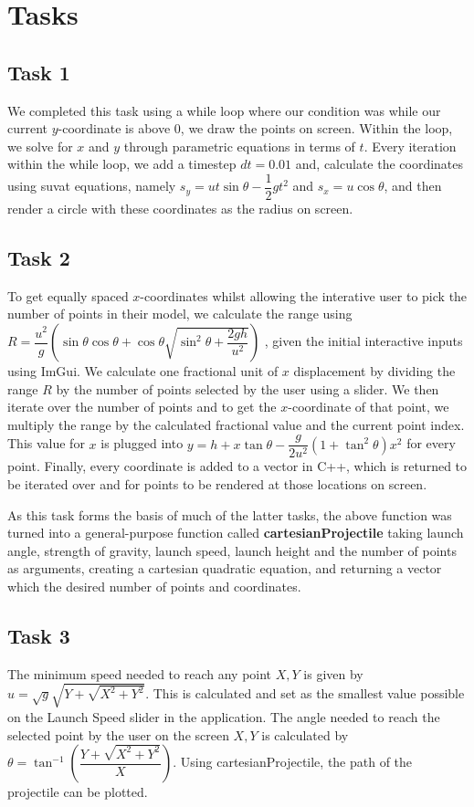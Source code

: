 \documentclass[main.tex]{subfiles}
\begin{document}
 
\section{Tasks}
\subsection{Task 1}
We completed this task using a while loop where our condition was while our current $y$-coordinate is above 0, we draw the points on screen. Within the loop, we solve for $x$ and $y$ through parametric equations in terms of $t$. Every iteration within the while loop, we add a timestep $dt = 0.01$ and, calculate the coordinates using suvat equations, namely $s_y = u t \sin\theta  - \dfrac{1}{2} g t^2$ and $s_x = u \cos\theta$, and then render a circle with these coordinates as the radius on screen.

\subsection{Task 2}
To get equally spaced $x$-coordinates whilst allowing the interative user to pick the number of points in their model, we calculate the range using $R = \dfrac{u^2}{g}\left(\sin\theta \cos\theta + \cos \theta \sqrt{\sin^2 \theta + \dfrac{2gh}{u^2}}\right)$ \cite{brief}, given the initial interactive inputs using ImGui. We calculate one fractional unit of $x$ displacement by dividing the range $R$ by the number of points selected by the user using a slider. We then iterate over the number of points and to get the $x$-coordinate of that point, we multiply the range by the calculated fractional value and the current point index. This value for $x$ is plugged into $y = h + x\tan\theta -\dfrac{g}{2u^2}\left(1+\tan^2\theta\right)x^2$ \cite{brief} for every point. Finally, every coordinate is added to a vector in C++, which is returned to be iterated over and for points to be rendered at those locations on screen.


\noindent As this task forms the basis of much of the latter tasks, the above function was turned into a general-purpose function called \textbf{cartesianProjectile} taking launch angle, strength of gravity, launch speed, launch height and the number of points as arguments, creating a cartesian quadratic equation, and returning a vector which the desired number of points and coordinates.

\subsection{Task 3}
The minimum speed needed to reach any point $X, Y$ is given by $u = \sqrt{g}\sqrt{Y + \sqrt{X^2 + Y^2}}$. This is calculated and set as the smallest value possible on the Launch Speed slider in the application. The angle needed to reach the selected point by the user on the screen $X, Y$ is calculated by $\theta = \tan^{-1}\left(\dfrac{Y + \sqrt{X^2 + Y^2}}{X}\right)$. Using cartesianProjectile, the path of the projectile can be plotted.
\end{document}

